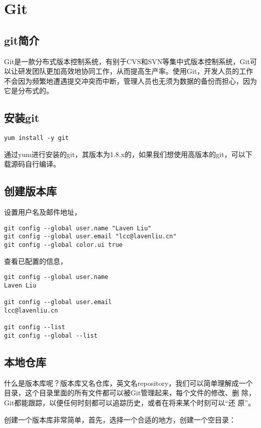 \chapter{Git}

\section{git简介}

Git是一款分布式版本控制系统，有别于CVS和SVN等集中式版本控制系统，Git可
以让研发团队更加高效地协同工作，从而提高生产率。使用Git，开发人员的工作
不会因为频繁地遭遇提交冲突而中断，管理人员也无须为数据的备份而担心，因为它是分布式的。

\section{安装git}

\begin{verbatim}
yum install -y git
\end{verbatim}

通过yum进行安装的git，其版本为1.8.x的，如果我们想使用高版本的git，可以下载源码自行编译。

\section{创建版本库}
设置用户名及邮件地址，
\begin{verbatim}
git config --global user.name "Laven Liu"
git config --global user.email "lcc@lavenliu.cn"
git config --global color.ui true
\end{verbatim}

查看已配置的信息，
\begin{verbatim}
git config --global user.name
Laven Liu

git config --global user.email
lcc@lavenliu.cn

git config --list
git config --global --list
\end{verbatim}

\section{本地仓库}

什么是版本库呢？版本库又名仓库，英文名repository，我们可以简单理解成一个
目录，这个目录里面的所有文件都可以被Git管理起来，每个文件的修改、删
除，Git都能跟踪，以便任何时刻都可以追踪历史，或者在将来某个时刻可以“还
原”。

创建一个版本库非常简单，首先，选择一个合适的地方，创建一个空目录：

